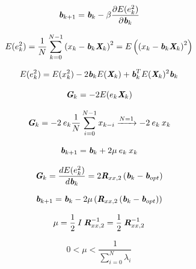 \documentclass[
    10pt, %
    DIV12,
    english, %
    a5paper, %
    twoside, %
    titlepage, %
    parskip=half, %
    headings=small, %
    listof=totoc, %
    bibliography=totoc, %
    index=totoc, %
    captions=tableheading, %
    final %
]{scrbook}
\begin{document}
\begin{equation}
\textit{\textbf{b}}_{k+1}=\textit{\textbf{b}}_k-\beta \frac{\partial E(e_k^2)}{\partial \textit{\textbf{b}}_k} \nonumber
\end{equation}

\begin{equation}
E(e_k^2) = \frac{1}{N}\sum_{k=0}^{N-1}\left(x_k-\textit{\textbf{b}}_k\textit{\textbf{X}}_k\right)^2=E\left(\left(x_k-\textit{\textbf{b}}_k\textit{\textbf{X}}_k\right)^2\right) \nonumber
\end{equation}

\begin{equation}
E(e_k^2) = E(x_k^2)-2\textit{\textbf{b}}_k E(\textit{\textbf{X}}_k)+\textit{\textbf{b}}_k^T E(\textit{\textbf{X}}_k)^2\textit{\textbf{b}}_k\nonumber
\end{equation}

\begin{equation}
\textit{\textbf{G}}_k=-2E(e_k{\textit{\textbf{X}}_k})\nonumber
\end{equation}

\begin{equation}
\textit{\textbf{G}}_k=-2\:e_k\frac{1}{N}\sum_{i=0}^{N-1}x_{k-i}\xrightarrow{N=1}-2\:e_k\:x_k\nonumber
\end{equation}

\begin{equation}
\textit{\textbf{b}}_{k+1}=\textit{\textbf{b}}_k+2\mu\:e_k\:x_k \nonumber
\end{equation}

\begin{equation}
\textit{\textbf{G}}_k=\frac{dE(e_k^2)}{d\textit{\textbf{b}}_k}=2\textit{\textbf{R}}_{xx,2}\left(\textit{\textbf{b}}_k-\textit{\textbf{b}}_{opt}\right)\nonumber
\end{equation}

\begin{equation}
\textit{\textbf{b}}_{k+1}=\textit{\textbf{b}}_k-2\mu\left(\textit{\textbf{R}}_{xx,2}\left(\textit{\textbf{b}}_k-\textit{\textbf{b}}_{opt}\right)\right)\nonumber
\end{equation}

\begin{equation}
\mu=\frac{1}{2}\:I\:\textit{\textbf{R}}_{xx,2}^{-1}=\frac{1}{2}\:\textit{\textbf{R}}_{xx,2}^{-1}\nonumber
\end{equation}

\begin{equation}
0 < \mu < \frac{1}{\sum\limits_{i=0}^{N}\lambda_i}\nonumber
\end{equation}
\end{document}
